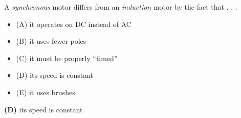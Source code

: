

A {\it synchronous} motor differs from an {\it induction} motor by the fact that . . .

\begin{itemize}
\item{(A)} it operates on DC instead of AC
\vskip 5pt 
\item{(B)} it uses fewer poles
\vskip 5pt 
\item{(C)} it must be properly ``timed'' 
\vskip 5pt 
\item{(D)} its speed is constant
\vskip 5pt 
\item{(E)} it uses brushes
\end{itemize}







{\bf (D)} its speed is constant











